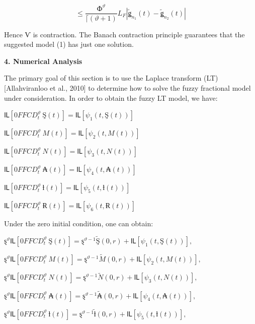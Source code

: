 \[\leq \frac{Ф^{\vartheta}}{\lceil(\vartheta + 1)}L_{F}\left| {\widetilde{ǥ}}_{n_{1}}(t) - {\widetilde{ǥ}}_{n_{2}}(t) \right|\]

Hence Ѵ is contraction. The Banach contraction principle guarantees that the suggested model (1) has just one solution.

\textbf{4. Numerical Analysis}

The primary goal of this section is to use the Laplace transform (LT) {[}Allahviranloo et al., 2010{]} to determine how to solve the fuzzy fractional model under consideration. In order to obtain the fuzzy LT model, we have:

\(Ỻ\left\lbrack 0FFCD_{t}^{\vartheta}\ Ş(t) \right\rbrack = Ỻ\left\lbrack \psi_{1}\left( t,Ş(t) \right) \right\rbrack\)

\(Ỻ\left\lbrack 0FFCD_{t}^{\vartheta}\ M(t) \right\rbrack = Ỻ\left\lbrack \psi_{2}\left( t,M(t) \right) \right\rbrack\)

\(Ỻ\left\lbrack 0FFCD_{t}^{\vartheta}\ N(t) \right\rbrack = Ỻ\left\lbrack \psi_{3}\left( t,N(t) \right) \right\rbrack\)

\(Ỻ\left\lbrack 0FFCD_{t}^{\vartheta}\ ₳(t) \right\rbrack = Ỻ\left\lbrack \psi_{4}\left( t,₳(t) \right) \right\rbrack\)

\(Ỻ\left\lbrack 0FFCD_{t}^{\vartheta}\ ƚ(t) \right\rbrack = Ỻ\left\lbrack \psi_{5}\left( t,ƚ(t) \right) \right\rbrack\)

\(Ỻ\left\lbrack 0FFCD_{t}^{\vartheta}\ Ɍ(t) \right\rbrack = Ỻ\left\lbrack \psi_{6}\left( t,Ɍ(t) \right) \right\rbrack\)

Under the zero initial condition, one can obtain:

\(ȿ^{\vartheta}Ỻ\left\lbrack 0FFCD_{t}^{\vartheta}\ Ş(t) \right\rbrack = ȿ^{\vartheta - 1}\widetilde{Ş}(0,r) + Ỻ\left\lbrack \psi_{1}\left( t,Ş(t) \right) \right\rbrack,\)

\(ȿ^{\vartheta}Ỻ\left\lbrack 0FFCD_{t}^{\vartheta}\ M(t) \right\rbrack = ȿ^{\vartheta - 1}\widetilde{M}(0,r) + Ỻ\left\lbrack \psi_{2}\left( t,M(t) \right) \right\rbrack,\)

\(ȿ^{\vartheta}Ỻ\left\lbrack 0FFCD_{t}^{\vartheta}\ N(t) \right\rbrack = ȿ^{\vartheta - 1}\widetilde{N}(0,r) + Ỻ\left\lbrack \psi_{3}\left( t,N(t) \right) \right\rbrack,\ \)

\(ȿ^{\vartheta}Ỻ\left\lbrack 0FFCD_{t}^{\vartheta}\ ₳(t) \right\rbrack = ȿ^{\vartheta - 1}\widetilde{₳}(0,r) + Ỻ\left\lbrack \psi_{4}\left( t,₳(t) \right) \right\rbrack,\)

\(ȿ^{\vartheta}Ỻ\left\lbrack 0FFCD_{t}^{\vartheta}\ ƚ(t) \right\rbrack = ȿ^{\vartheta - 1}\widetilde{ƚ}(0,r) + Ỻ\left\lbrack \psi_{5}\left( t,ƚ(t) \right) \right\rbrack,\)

